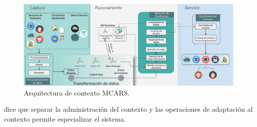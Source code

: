 \begin{figure}[ht]
\centering%
\includegraphics[width=\textwidth]{Cap3/Images/Diagrama_Contexto_v2}%
\caption{Arquitectura de contexto MCARS.} \label{fig:Diagrama_Contexto}
\end{figure}


\cite{Avenoglu2017} dice que separar la administración del contexto y las operaciones de adaptación al contexto permite especializar el sistema.